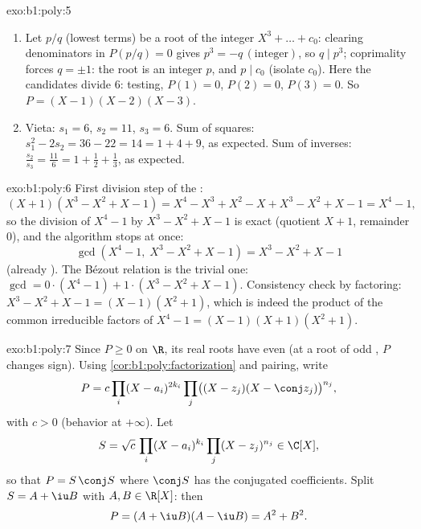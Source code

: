 \begin{solution}{exo:b1:poly:5}
\begin{enumerate}
  \item Let $p/q$ (lowest terms) be a root of the  integer
         $X^3 + \dots + c_0$: clearing denominators in
        $P(p/q) = 0$ gives $p^3 = -q\,(\text{integer})$, so $q \mid
        p^3$; coprimality forces $q = \pm 1$: the root is an integer
        $p$, and $p \mid c_0$ (isolate $c_0$). Here the candidates
        divide $6$: testing, $P(1) = 0$, $P(2) = 0$, $P(3) = 0$. So
        $P = (X-1)(X-2)(X-3)$.
  \item Vieta: $s_1 = 6$, $s_2 = 11$, $s_3 = 6$. Sum of squares:
        $s_1^2 - 2s_2 = 36 - 22 = 14 = 1 + 4 + 9$, as expected. Sum of inverses:
        $\frac{s_2}{s_3} = \frac{11}{6} = 1 + \frac12 + \frac13$, as expected.
\end{enumerate}
\end{solution}

\begin{solution}{exo:b1:poly:6}
First division step of the :
\[
(X + 1)(X^3 - X^2 + X - 1)
= X^4 - X^3 + X^2 - X + X^3 - X^2 + X - 1 = X^4 - 1 ,
\]
so the division of $X^4 - 1$ by $X^3 - X^2 + X - 1$ is exact
(quotient $X + 1$, remainder $0$), and the algorithm stops at once:
\[
\gcd(X^4 - 1,\; X^3 - X^2 + X - 1) = X^3 - X^2 + X - 1
\]
(already ). The Bézout relation is the trivial one: $\gcd = 0
\cdot (X^4 - 1) + 1 \cdot (X^3 - X^2 + X - 1)$. Consistency check by
factoring: $X^3 - X^2 + X - 1 = (X - 1)(X^2 + 1)$, which is indeed
the product of the common irreducible factors of $X^4 - 1 =
(X-1)(X+1)(X^2+1)$.
\end{solution}

\begin{solution}{exo:b1:poly:7}
Since $P \geq 0$ on $\R$, its real roots have even  (at a
root of odd , $P$ changes sign). Using
\cref{cor:b1:poly:factorization} and pairing, write
\[
P = c \prod_i (X - a_i)^{2k_i} \prod_j \bigl((X - z_j)(X - \conj
z_j)\bigr)^{n_j},
\]
with $c > 0$ (behavior at $+\infty$). Let
\[
S = \sqrt c\, \prod_i (X - a_i)^{k_i} \prod_j (X - z_j)^{n_j}
\in \C[X],
\]
so that $P = S\,\conj S$ where $\conj S$ has the conjugated
coefficients. Split $S = A + \iu B$ with $A, B \in \R[X]$: then
\[
P = (A + \iu B)(A - \iu B) = A^2 + B^2 .
\]
\end{solution}

